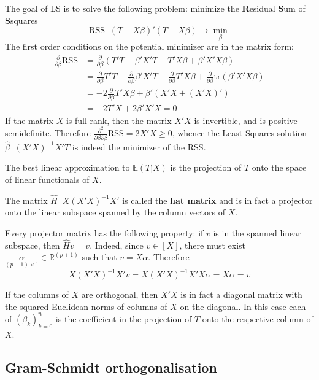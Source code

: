 \documentclass[a4paper]{article}
\newcommand{\clo}[1]{{\left [ #1 \right ]}}
\newcommand{\brac}[1]{{\left ( #1 \right )}}
\newcommand{\Real}{\mathbb{R}}
\newcommand{\ex}{\mathbb{E}}
\newcommand{\RSS}{\text{RSS}}
\newcommand{\tr}{\text{tr}}
\newcommand{\defn}{\mathop{\overset{\Delta}{=}}\nolimits}
\begin{document}
The goal of LS is to solve the following problem: minimize the \textbf{R}esidual
\textbf{S}um of \textbf{S}squares
\[\RSS \defn \brac{T-X\beta}'\brac{T-X\beta} \to \min_\beta\]
The first order conditions on the potential minimizer are in the matrix form:
\begin{align*}
	\frac{\partial}{\partial \beta}\RSS &= \frac{\partial}{\partial \beta}\brac{T'T-\beta'X'T - T'X\beta + \beta'X'X\beta}\\
	&= \frac{\partial}{\partial \beta} T'T - \frac{\partial}{\partial \beta} \beta'X'T - \frac{\partial}{\partial \beta} T'X\beta + \frac{\partial}{\partial \beta} \tr\brac{\beta'X'X\beta}\\
	&= - 2 \frac{\partial}{\partial \beta} T'X\beta + \beta'\brac{X'X + \brac{X'X}'}\\
	&= - 2 T'X + 2 \beta'X'X = 0
\end{align*}
If the matrix $X$ is full rank, then the matrix $X'X$ is invertible, and is positive-semidefinite.
Therefore $\frac{\partial^2}{\partial \beta\partial \beta}\RSS = 2 X'X \geq 0$,
whence the Least Squares solution $\hat{\beta} \defn \brac{X'X}^{-1} X'T$ is indeed
the minimizer of the RSS.

The best linear approximation to $\ex(T\rvert X)$ is the projection of $T$ onto
the space of linear functionals of $X$.

The matrix $\hat{H} \defn X\brac{X'X}^{-1}X'$ is called the \textbf{hat matrix} and
is in fact a projector onto the linear subspace spanned by the column vectors of $X$.

Every projector matrix has the following property: if $v$ is in the spanned linear
subspace, then $\hat{H}v = v$. Indeed, since $v\in \clo{X}$, there must exist
$\underset{(p+1)\times 1}{\alpha}\in \Real^{(p+1)}$ such that $v = X\alpha$.
Therefore
\[X\brac{X'X}^{-1}X'v = X\brac{X'X}^{-1}X'X\alpha = X\alpha = v\]

If the columns of $X$ are orthogonal, then $X'X$ is in fact a diagonal matrix
with the squared Euclidean norms of columns of $X$ on the diagonal. In this case
each of $\brac{\beta_k}_{k=0}^n$ is the coefficient in the projection of $T$ onto
the respective column of $X$.


\subsection*{Gram-Schmidt orthogonalisation} %
\label{sub:gram_schmidt_orthogonalisation}
\end{document}
